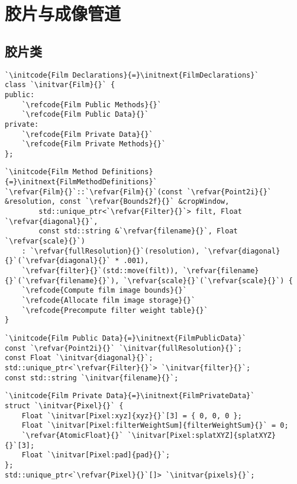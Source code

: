 \section{胶片与成像管道}\label{sec:胶片与成像管道}

\subsection{胶片类}\label{sub:胶片类}

\begin{lstlisting}
`\initcode{Film Declarations}{=}\initnext{FilmDeclarations}`
class `\initvar{Film}{}` {
public:
    `\refcode{Film Public Methods}{}`
    `\refcode{Film Public Data}{}`
private:
    `\refcode{Film Private Data}{}`
    `\refcode{Film Private Methods}{}`
};
\end{lstlisting}

\begin{lstlisting}
`\initcode{Film Method Definitions}{=}\initnext{FilmMethodDefinitions}`
`\refvar{Film}{}`::`\refvar{Film}{}`(const `\refvar{Point2i}{}` &resolution, const `\refvar{Bounds2f}{}` &cropWindow,
        std::unique_ptr<`\refvar{Filter}{}`> filt, Float `\refvar{diagonal}{}`,
        const std::string &`\refvar{filename}{}`, Float `\refvar{scale}{}`)
    : `\refvar{fullResolution}{}`(resolution), `\refvar{diagonal}{}`(`\refvar{diagonal}{}` * .001),
    `\refvar{filter}{}`(std::move(filt)), `\refvar{filename}{}`(`\refvar{filename}{}`), `\refvar{scale}{}`(`\refvar{scale}{}`) {
    `\refcode{Compute film image bounds}{}`
    `\refcode{Allocate film image storage}{}`
    `\refcode{Precompute filter weight table}{}`
}
\end{lstlisting}

\begin{lstlisting}
`\initcode{Film Public Data}{=}\initnext{FilmPublicData}`
const `\refvar{Point2i}{}` `\initvar{fullResolution}{}`;
const Float `\initvar{diagonal}{}`;
std::unique_ptr<`\refvar{Filter}{}`> `\initvar{filter}{}`;
const std::string `\initvar{filename}{}`;
\end{lstlisting}

\begin{lstlisting}
`\initcode{Film Private Data}{=}\initnext{FilmPrivateData}`
struct `\initvar{Pixel}{}` {
    Float `\initvar[Pixel:xyz]{xyz}{}`[3] = { 0, 0, 0 };
    Float `\initvar[Pixel:filterWeightSum]{filterWeightSum}{}` = 0;
    `\refvar{AtomicFloat}{}` `\initvar[Pixel:splatXYZ]{splatXYZ}{}`[3];
    Float `\initvar[Pixel:pad]{pad}{}`;
};
std::unique_ptr<`\refvar{Pixel}{}`[]> `\initvar{pixels}{}`;
\end{lstlisting}

